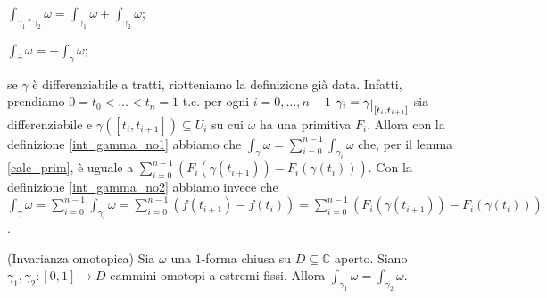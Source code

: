 \begin{ftt}
  \begin{nlist}
    \item $\displaystyle \int_{\gamma_1*\gamma_2} \omega=\int_{\gamma_1}\omega+\int_{\gamma_2}\omega$;
    \item $\displaystyle \int_{\bar{\gamma}} \omega=-\int_{\gamma} \omega$;
    \item se $\gamma$ è differenziabile a tratti, riotteniamo la definizione già data. Infatti, prendiamo $0=t_0<\dots<t_n=1$ t.c. per ogni $i=0, \dots, n-1$ $\gamma_i=\gamma\restrict{[t_i, t_{i+1}]}$ sia differenziabile e $\gamma([t_i, t_{i+1}]) \subseteq U_i$ su cui $\omega$ ha una primitiva $F_i$.
    Allora con la definizione \ref{int_gamma_no1} abbiamo che $\displaystyle \int_{\gamma} \omega=\sum_{i=0}^{n-1} \int_{\gamma_i} \omega$ che, per il lemma \ref{calc_prim}, è uguale a $\displaystyle \sum_{i=0}^{n-1} (F_i(\gamma(t_{i+1}))-F_i(\gamma(t_i)))$.
    Con la definizione \ref{int_gamma_no2} abbiamo invece che $\displaystyle \int_{\gamma} \omega=\sum_{i=0}^{n-1} \int_{\gamma_i} \omega=\sum_{i=0}^{n-1} (f(t_{i+1})-f({t_i}))=\sum_{i=0}^{n-1} (F_i(\gamma(t_{i+1}))-F_i(\gamma(t_i)))$.
  \end{nlist}
\end{ftt}

\begin{thm} \label{inv_omo_int}
  (Invarianza omotopica) Sia $\omega$ una $1$-forma chiusa su $D \subseteq \mathbb{C}$ aperto. Siano $\gamma_1, \gamma_2:[0, 1] \longrightarrow D$ cammini omotopi a estremi fissi. Allora $\displaystyle \int_{\gamma_1} \omega=\int_{\gamma_2} \omega$.
\end{thm}

